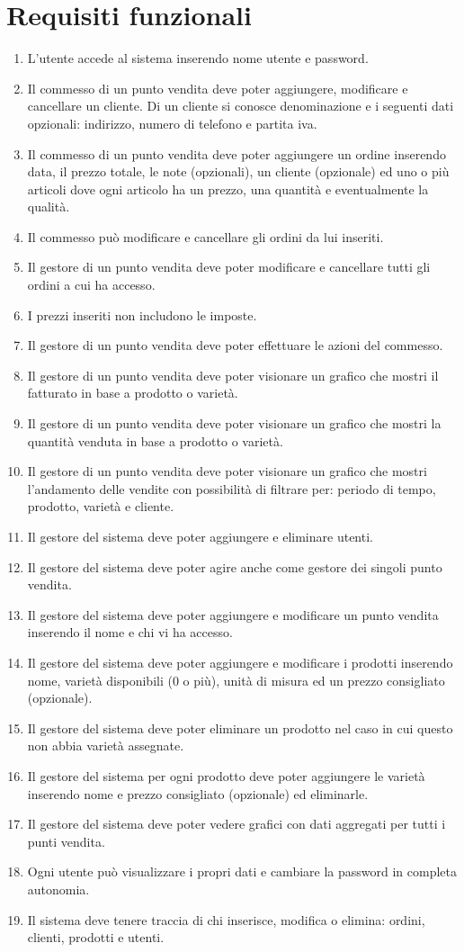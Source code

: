 \documentclass[italian]{report}
\begin{document}
\section{Requisiti funzionali}
\begin{enumerate}
  \item L’utente accede al sistema inserendo nome utente e password.
  \item Il commesso di un punto vendita deve poter aggiungere, modificare e cancellare un cliente. Di un cliente si conosce denominazione e i seguenti dati opzionali: indirizzo, numero di telefono e partita iva.
  \item Il commesso di un punto vendita deve poter aggiungere un ordine inserendo data, il prezzo totale, le note (opzionali), un cliente (opzionale) ed uno o più articoli dove ogni articolo ha un prezzo, una quantità e eventualmente la qualità.
  \item Il commesso può modificare e cancellare gli ordini da lui inseriti.
  \item Il gestore di un punto vendita deve poter modificare e cancellare tutti gli ordini a cui ha accesso.
  \item I prezzi inseriti non includono le imposte.
  \item Il gestore di un punto vendita deve poter effettuare le azioni del commesso.
  \item Il gestore di un punto vendita deve poter visionare un grafico che mostri il fatturato in base a prodotto o varietà.
  \item Il gestore di un punto vendita deve poter visionare un grafico che mostri la quantità venduta in base a prodotto o varietà.
  \item Il gestore di un punto vendita deve poter visionare un grafico che mostri l'andamento delle vendite con possibilità di filtrare per: periodo di tempo, prodotto, varietà e cliente.
  \item Il gestore del sistema deve poter aggiungere e eliminare utenti.
  \item Il gestore del sistema deve poter agire anche come gestore dei singoli punto vendita.
  \item Il gestore del sistema deve poter aggiungere e modificare un punto vendita inserendo il nome e chi vi ha accesso.
  \item Il gestore del sistema deve poter aggiungere e modificare i prodotti inserendo nome, varietà disponibili (0 o più), unità di misura ed un prezzo consigliato (opzionale).
  \item Il gestore del sistema deve poter eliminare un prodotto nel caso in cui questo non abbia varietà assegnate.
  \item Il gestore del sistema per ogni prodotto deve poter aggiungere le varietà inserendo nome e prezzo consigliato (opzionale) ed eliminarle.
  \item Il gestore del sistema deve poter vedere grafici con dati aggregati per tutti i punti vendita.
  \item Ogni utente può visualizzare i propri dati e cambiare la password in completa autonomia.
  \item Il sistema deve tenere traccia di chi inserisce, modifica o elimina: ordini, clienti, prodotti e utenti.
\end{enumerate}
\end{document}
